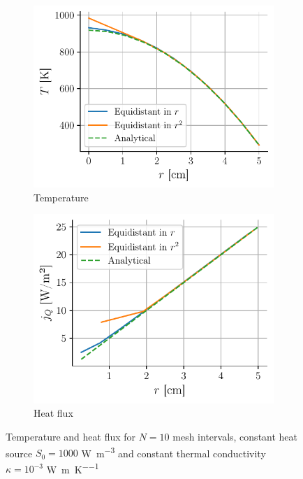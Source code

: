 \begin{figure}[h]
    \centering
    \begin{subfigure}{0.5\linewidth}
        \centering
        \includegraphics[width=\linewidth]{figures/temperature_constant.pdf}
        \caption{Temperature}
        \label{fig:temperature_constant}
    \end{subfigure}
    \begin{subfigure}{0.48\linewidth}
        \centering
        \includegraphics[width=\linewidth]{figures/heat_constant.pdf}
        \caption{Heat flux}
        \label{fig:heat_constant}
    \end{subfigure}
    \caption{Temperature and heat flux for \(N = 10\) mesh intervals, constant heat source \(S_0 = 1000\) \si{\watt\per\meter\cubed} and constant thermal conductivity \(\kappa = 10^{-3}\) \si{\watt\per\meter\per\kelvin}}
\end{figure}

